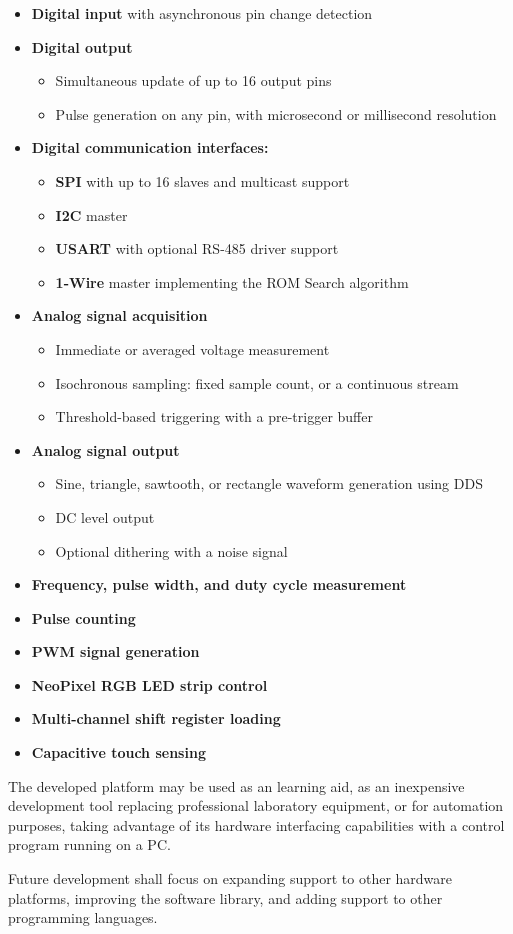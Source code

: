 \begin{itemize}[itemsep=1pt]
	\item \textbf{Digital input} with asynchronous pin change detection
	\item \textbf{Digital output} 
		\begin{itemize}
			\item Simultaneous update of up to 16 output pins
			\item Pulse generation on any pin, with microsecond or millisecond resolution
		\end{itemize}	
	\item \textbf{Digital communication interfaces:}
\begin{itemize}
\item \textbf{\gls{SPI}} with up to 16 slaves and multicast support
\item \textbf{\gls{I2C}} master
\item \textbf{\gls{USART}} with optional RS-485 driver support
\item \textbf{1-Wire} master implementing the \gls{ROM} Search algorithm
\end{itemize}
	\item \textbf{Analog signal acquisition}
		\begin{itemize}
			\item Immediate or averaged voltage measurement
			\item Isochronous sampling: fixed sample count, or a continuous stream
			\item Threshold-based triggering with a pre-trigger buffer
		\end{itemize}
	\item \textbf{Analog signal output}
		\begin{itemize}
			\item Sine, triangle, sawtooth, or rectangle waveform generation using \gls{DDS}
			\item \gls{DC} level output
			\item Optional dithering with a noise signal
		\end{itemize}
	\item \textbf{Frequency, pulse width, and duty cycle measurement}
	\item \textbf{Pulse counting}
	\item \textbf{\gls{PWM} signal generation}	
	\item \textbf{NeoPixel RGB \gls{LED} strip control}
	\item \textbf{Multi-channel shift register loading}
	\item \textbf{Capacitive touch sensing}
\end{itemize}

The developed platform may be used as an learning aid, as an inexpensive development tool replacing professional laboratory equipment, or for automation purposes, taking advantage of its hardware interfacing capabilities with a control program running on a PC.

Future development shall focus on expanding support to other hardware platforms, improving the software library, and adding support to other programming languages.
